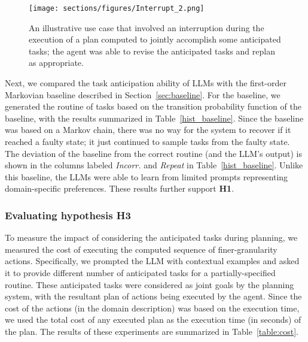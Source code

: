 \begin{figure*}[tb]
\centering
\captionsetup{font=scriptsize}
\setlength{\belowcaptionskip}{-12pt}
\setlength{\abovecaptionskip}{5pt}
\texttt{[image: sections/figures/Interrupt\_2.png]}
\caption{An illustrative use case that involved an interruption during the execution of a plan computed to jointly accomplish some anticipated tasks; the agent was able to revise the anticipated tasks and replan as appropriate.}
\label{fig:interrupt}
\end{figure*}
\vspace{-1em}
Next, we compared the task anticipation ability of LLMs with the first-order Markovian baseline described in Section~\ref{sec:baseline}. For the baseline, we generated the routine of tasks based on the transition probability function of the baseline, with the results summarized in Table~\ref{hist_baseline}. Since the baseline was based on a Markov chain, there was no way for the system to recover if it reached a faulty state; it just continued to sample tasks from the faulty state. The deviation of the baseline from the correct routine (and the LLM's output) is shown in the columns labeled \textit{Incorr.} and \textit{Repeat} in Table~\ref{hist_baseline}. Unlike this baseline, the LLMs were able to %
learn from limited prompts representing domain-specific preferences. These results further support \textbf{H1}.

\subsubsection{Evaluating hypothesis H3}
To measure the impact of considering the anticipated tasks during planning, we measured the cost of executing the computed sequence of finer-granularity actions. Specifically, we prompted the LLM with contextual examples and asked it to provide different number of anticipated tasks for a partially-specified routine. These anticipated tasks were considered as joint goals by the planning system, with the resultant plan of actions being executed by the agent. Since the cost of the actions (in the domain description) was based on the execution time, we used the total cost of any executed plan as the execution time (in seconds) of the plan. The results of these experiments are summarized in Table~\ref{table:cost}. 

